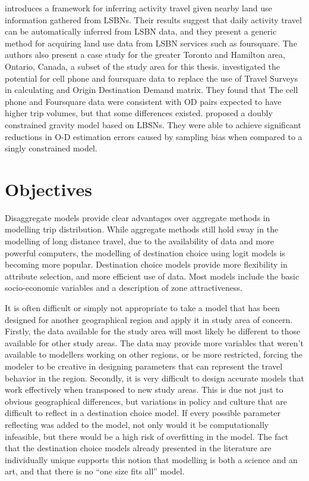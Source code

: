 \textcite{abdulazim2015framework} introduces a framework for inferring activity travel given nearby land use information gathered from LSBNs. Their results suggest that daily activity travel can be automatically inferred from LSBN data, and they present a generic method for acquiring land use data from LSBN services such as foursquare. The authors also present a case study for the  greater Toronto and Hamilton area, Ontario, Canada, a subset of the study area for this thesis.
\textcite{sa2015origin} investigated the potential for cell phone and foursquare data to replace the use of Travel Surveys in calculating and Origin Destination Demand matrix. They found that The cell phone and Foursquare data were consistent with OD pairs expected to have higher trip volumes, but that some differences existed.
\textcite{jin2014location} proposed a doubly constrained gravity model based on LBSNs. They were able to achieve significant reductions in O-D estimation errors caused by sampling bias when compared to a singly constrained model.

\section{Objectives}
Disaggregate models provide clear advantages over aggregate methods in modelling trip distribution. While aggregate methods still hold sway in the modelling of long distance travel, due to the availability of data and more powerful computers, the modelling of destination choice using logit models is becoming more popular. Destination choice models provide more flexibility in attribute selection, and more efficient use of data. Most models include the basic socio-economic variables and a description of zone attractiveness. 

It is often difficult or simply not appropriate to take a model that has been designed for another geographical region and apply it in study area of concern. Firstly, the data available for the study area will most likely be different to those available for other study areas. The data may provide more variables that weren't available to modellers working on other regions, or be more restricted, forcing the modeler to be creative in designing parameters that can represent the travel behavior in the region. Secondly, it is very difficult to design accurate models that work effectively when transposed to new study areas. This is due not just to obvious geographical differences, but variations in policy and culture that are difficult to reflect in a destination choice model. If every possible parameter reflecting was added to the model, not only would it be computationally infeasible, but there would be a high risk of overfitting in the model. The fact that the destination choice models already presented in the literature are individually unique supports this notion that modelling is both a science and an art, and that there is no \enquote{one size fits all} model.

